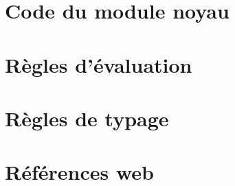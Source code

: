 \documentclass[a4paper,11pt]{memoir}
\begin{document}
\appendix

\chapter{Code du module noyau}

\label{cha:code-noyau}


\chapter{Règles d'évaluation}



\chapter{Règles de typage}



\backmatter


\listoftodos

\clearpage

\listoffigures

\chapter{Références web}

\insertlinks



\end{document}
